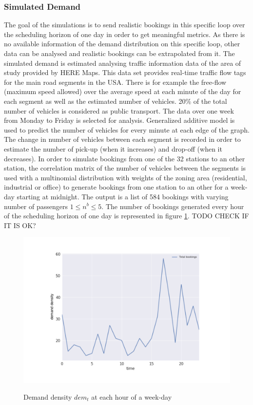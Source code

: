 \documentclass[12pt,a4paper]{article}
\begin{document}
\subsubsection{Simulated Demand}\label{simdem}
The goal of the simulations is to send realistic bookings in this specific loop over the scheduling horizon of one day in order to get meaningful metrics. As there is no available information of the demand distribution on this specific loop, other data can be analysed and realistic bookings can be extrapolated from it. The simulated demand is estimated analysing traffic information data of the area of study provided by HERE Maps. This data set provides real-time traffic flow tags for the main road segments in the USA. There is for example the free-flow (maximum speed allowed) over the average speed at each minute of the day for each segment as well as the estimated number of vehicles. 20\% of the total number of vehicles is considered as public transport. The data over one week from Monday to Friday is selected for analysis. Generalized additive model is used to predict the number of vehicles for every minute at each edge of the graph. The change in number of vehicles between each segment is recorded in order to estimate the number of pick-up (when it increases) and drop-off (when it decreases). In order to simulate bookings from one of the 32 stations to an other station, the correlation matrix of the number of vehicles between the segments is used with a multinomial distribution with weights of the zoning area (residential, industrial or office) to generate bookings from one station to an other for a week-day starting at midnight. The output is a list of 584 bookings with varying number of passengers $1 \leq n^{b} \leq 5$. The number of bookings generated every hour of the scheduling horizon of one day is represented in figure \ref{fig:demand}.
TODO CHECK IF IT IS OK?

\begin{figure}[h] 
  \centering
  \caption{Demand density $dem_{t}$ at each hour of a week-day}
\includegraphics[scale=0.5]{./images/demand.pdf}
\label{fig:demand}
\end{figure}
\end{document}

